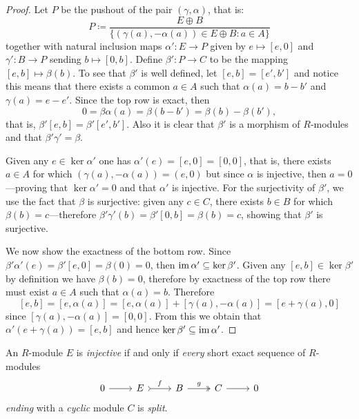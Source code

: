 \begin{proof}
Let \(P\) be the pushout of the pair \((\gamma, \alpha)\), that is:
\[
P \coloneq
\frac{E \oplus B}{\{(\gamma(a), - \alpha(a)) \in E \oplus B \colon a \in A\}}
\]
together with natural inclusion maps \(\alpha': E \to P\) given by
\(e \mapsto [e, 0]\) and \(\gamma': B \to P\) sending \(b \mapsto [0,
b]\). Define \(\beta': P \to C\) to be the mapping \([e, b] \mapsto
\beta(b)\). To see that \(\beta'\) is well defined, let \([e, b] = [e', b']\)
and notice this means that there exists a common \(a \in A\) such that
\(\alpha(a) = b - b'\) and \(\gamma(a) = e - e'\). Since the top row is exact,
then
\[
0 = \beta\alpha(a) = \beta(b - b') = \beta(b) - \beta(b'),
\]
that is, \(\beta'[e, b] = \beta'[e', b']\). Also it is clear that \(\beta'\) is
a morphism of \(R\)-modules and that \(\beta' \gamma' = \beta\).

Given any \(e \in \ker \alpha'\) one has \(\alpha'(e) = [e, 0] = [0, 0]\), that
is, there exists \(a \in A\) for which \((\gamma(a), -\alpha(a)) = (e, 0)\) but
since \(\alpha\) is injective, then \(a = 0\)---proving that
\(\ker \alpha' = 0\) and that \(\alpha'\) is injective. For the surjectivity of
\(\beta'\), we use the fact that \(\beta\) is surjective: given any \(c \in C\),
there exists \(b \in B\) for which \(\beta(b) = c\)---therefore
\(\beta' \gamma'(b) = \beta'[0, b] = \beta(b) = c\), showing that \(\beta'\) is
surjective.

We now show the exactness of the bottom row. Since
\(\beta'\alpha'(e) = \beta'[e, 0] = \beta(0) = 0\), then
\(\operatorname{im} \alpha' \subseteq \ker \beta'\). Given any \([e, b] \in \ker \beta'\) by
definition we have \(\beta(b) = 0\), therefore by exactness of the top row there
must exist \(a \in A\) such that \(\alpha(a) = b\). Therefore
\[
[e, b] = [e, \alpha(a)]
= [e, \alpha(a)] + [\gamma(a), -\alpha(a)]
= [e + \gamma(a), 0]
\]
since \([\gamma(a), -\alpha(a)] = [0, 0]\). From this we obtain that
\(\alpha'(e + \gamma(a)) = [e, b]\) and hence
\(\ker \beta' \subseteq \operatorname{im} \alpha'\).
\end{proof}

\begin{proposition}
\label{prop:injective-iff-split-cyclic}
An \(R\)-module \(E\) is \emph{injective} if and only if \emph{every} short
exact sequence of \(R\)-modules
\[
\begin{tikzcd}
0 \ar[r] &E \ar[r, tail, "f"] &B \ar[r, two heads, "g"] &C \ar[r] &0
\end{tikzcd}
\]
\emph{ending} with a \emph{cyclic} module \(C\) is \emph{split}.
\end{proposition}


